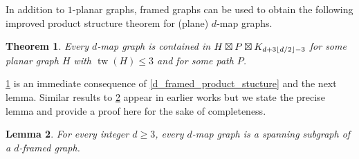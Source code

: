 \documentclass{patmorin}
\theoremstyle{plain}
\newtheorem{thm}{Theorem}
\newtheorem{lem}[thm]{Lemma}
\theoremstyle{definition}
\newcommand{\defin}[1]{\textcolor{Maroon}{\emph{#1}}}
\newcommand{\note}[2]{\noindent{\color{red}[#1:~#2]}}
\DeclareMathOperator{\tw}{tw}
\DeclarePairedDelimiter{\floor}{\lfloor}{\rfloor}
\renewcommand{\geq}{\geqslant}
\renewcommand{\leq}{\leqslant}
\begin{document}
% 

In addition to $1$-planar graphs, framed graphs can be used to obtain the following improved product structure theorem for (plane) $d$-map graphs.

\begin{thm}
\label{dMapProduct}
Every $d$-map graph is contained in $H \boxtimes P \boxtimes K_{ d + 3\floor{d/2} -3 }$ for some planar graph $H$ with $\tw(H) \leq 3$ and for some path $P$.
\end{thm}

\cref{dMapProduct} is an immediate consequence of \cref{d_framed_product_stucture} and the next lemma. Similar results to \cref{MewMapGraphLemma} appear in earlier works \cite{CGP06,BDGGMR,Brandenburg19,Brandenburg20} but we state the precise lemma and provide a proof here for the sake of completeness.



\begin{lem}
\label{MewMapGraphLemma}
For every %
integer %
 $d\geq 3$, every $d$-map graph is a spanning subgraph of a $d$-framed graph.
\end{lem}
\end{document}
